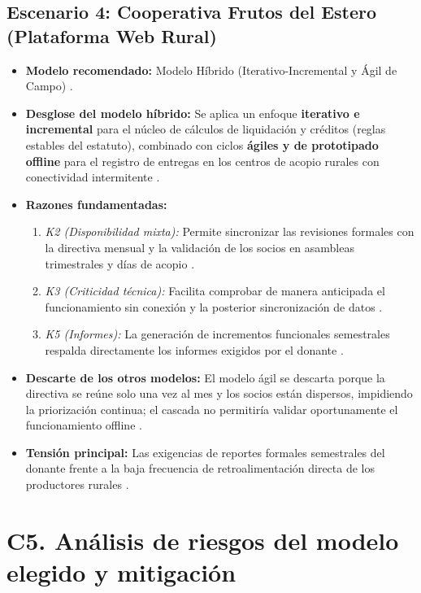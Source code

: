 \documentclass[12pt,a4paper]{article}
\begin{document}
\subsection{Escenario 4: Cooperativa Frutos del Estero (Plataforma Web Rural)}
\begin{itemize}
    \item \textbf{Modelo recomendado:} Modelo Híbrido (Iterativo-Incremental y Ágil de Campo) \cite{GA_Prac_01}.
    \item \textbf{Desglose del modelo híbrido:} Se aplica un enfoque \textbf{iterativo e incremental} para el núcleo de cálculos de liquidación y créditos (reglas estables del estatuto), combinado con ciclos \textbf{ágiles y de prototipado offline} para el registro de entregas en los centros de acopio rurales con conectividad intermitente \cite{GA_Prac_01}.
    \item \textbf{Razones fundamentadas:}
        \begin{enumerate}
            \item \textit{K2 (Disponibilidad mixta):} Permite sincronizar las revisiones formales con la directiva mensual y la validación de los socios en asambleas trimestrales y días de acopio \cite{GA_Prac_01}.
            \item \textit{K3 (Criticidad técnica):} Facilita comprobar de manera anticipada el funcionamiento sin conexión y la posterior sincronización de datos \cite{GA_Prac_01}.
            \item \textit{K5 (Informes):} La generación de incrementos funcionales semestrales respalda directamente los informes exigidos por el donante \cite{GA_Prac_01}.
        \end{enumerate}
    \item \textbf{Descarte de los otros modelos:} El modelo ágil se descarta porque la directiva se reúne solo una vez al mes y los socios están dispersos, impidiendo la priorización continua; el cascada no permitiría validar oportunamente el funcionamiento offline \cite{GA_Prac_01}.
    \item \textbf{Tensión principal:} Las exigencias de reportes formales semestrales del donante frente a la baja frecuencia de retroalimentación directa de los productores rurales \cite{GA_Prac_01}.
\end{itemize}

\section{C5. Análisis de riesgos del modelo elegido y mitigación}
\end{document}
